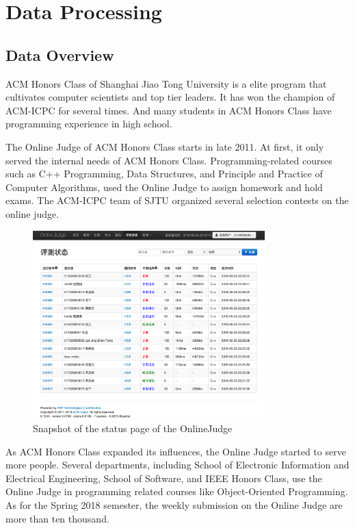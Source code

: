 
\chapter{Data Processing}

\section{Data Overview}

    ACM Honors Class\cite{acmclass} of Shanghai Jiao Tong University is a elite program
    that cultivates computer scientists and top tier leaders.
    It has won the champion of ACM-ICPC for several times.
    And many students in ACM Honors Class have programming experience in high school.

    The Online Judge\cite{acmoj} of ACM Honors Class starts in late 2011.
    At first, it only served the internal needs of ACM Honors Class.
    Programming-related courses such as C++ Programming, Data Structures,
    and Principle and Practice of Computer Algorithms,
    used the Online Judge to assign homework and hold exams.
    The ACM-ICPC team of SJTU organized several selection contests on the online judge.

    \begin{figure}[htp]
        \centering
        \includegraphics[width=0.8\textwidth]{img/acmoj.png}
        \caption{Snapshot of the status page of the OnlineJudge}
        \label{fig:acmoj}
    \end{figure}

    As ACM Honors Class expanded its influences, the Online Judge started to serve more people.
    Several departments, including School of Electronic Information and Electrical Engineering,
    School of Software, and IEEE Honors Class, use the Online Judge in programming related courses
    like Object-Oriented Programming.
    As for the Spring 2018 semester, the weekly submission on the Online Judge are more than ten thousand.

